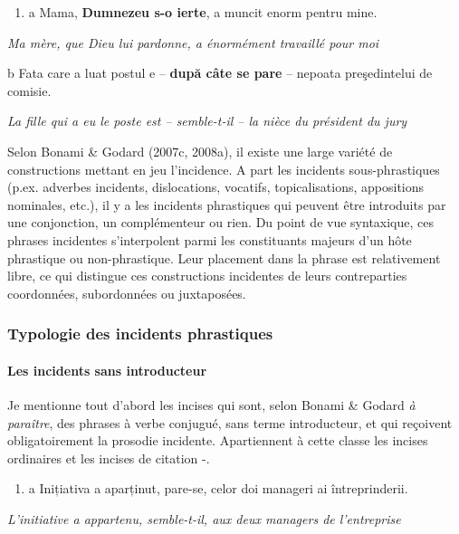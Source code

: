 \begin{enumerate}
\item \label{bkm:Ref274849789}a  Mama, \textbf{Dumnezeu s-o ierte}, a muncit enorm pentru mine.


\end{enumerate}
{\itshape
Ma mère, que Dieu lui pardonne, a énormément travaillé pour moi}

  b  Fata care a luat postul e -- \textbf{după câte se pare} -- nepoata preşedintelui de comisie.

{\itshape
La fille qui a eu le poste est -- semble-t-il -- la nièce du président du jury}

Selon Bonami \& Godard (2007c, 2008a), il existe une large variété de constructions mettant en jeu l'incidence. A part les incidents sous-phrastiques (p.ex. adverbes incidents, dislocations, vocatifs, topicalisations, appositions nominales, etc.), il y a les incidents phrastiques qui peuvent être introduits par une conjonction, un complémenteur ou rien. Du point de vue syntaxique, ces phrases incidentes s'interpolent parmi les constituants majeurs d'un hôte phrastique ou non-phrastique. Leur placement dans la phrase est relativement libre, ce qui distingue ces constructions incidentes de leurs contreparties coordonnées, subordonnées ou juxtaposées.

\subsubsection{Typologie des incidents phrastiques} 
\label{bkm:Ref302039771}\paragraph[Les incidents sans introducteur]{Les incidents sans introducteur}
Je mentionne tout d'abord les incises qui sont, selon Bonami \& Godard \textit{à paraître}, des phrases à verbe conjugué, sans terme introducteur, et qui reçoivent obligatoirement la prosodie incidente. Apartiennent à cette classe les incises ordinaires  et les incises de citation -. 


\begin{enumerate}
\item \label{bkm:Ref275288250}a  Inițiativa a aparținut, pare-se, celor doi manageri ai întreprinderii.


\end{enumerate}
{\itshape
L'initiative a appartenu, semble-t-il, aux deux managers de l'entreprise}


